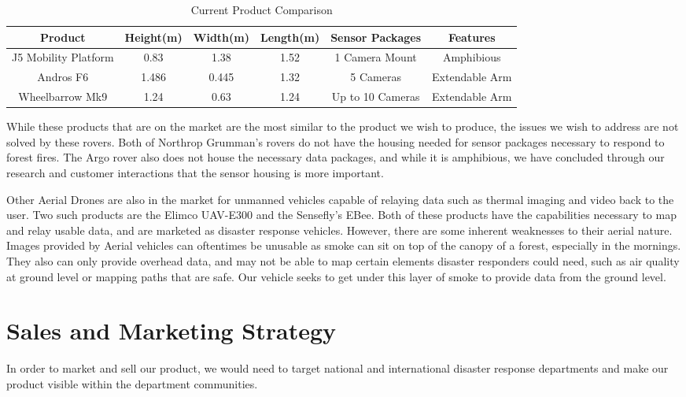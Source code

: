 \begin{table}[H]
	\begin{adjustwidth}{-.5in}{-.5in}
		\centering
		\begin{tabular}{c|c|c|c|c|c}
			Product & Height(m) & Width(m) & Length(m) & Sensor Packages & Features\\\hline
			J5 Mobility Platform & 0.83 & 1.38 & 1.52 & 1 Camera Mount & Amphibious\\
			Andros F6 & 1.486 & 0.445 & 1.32 & 5 Cameras & Extendable Arm \\
			Wheelbarrow Mk9 & 1.24 & 0.63 & 1.24 & Up to 10 Cameras & Extendable Arm\\
		\end{tabular}
		\caption{\label{tab:current} Current Product Comparison}
	\end{adjustwidth}
\end{table}

While these products that are on the market are the most similar to the product we wish to produce, the issues we wish to address are not solved by these rovers. Both of Northrop Grumman's rovers do not have the housing needed for sensor packages necessary to respond to forest fires. The Argo rover also does not house the necessary data packages, and while it is amphibious, we have concluded through our research and customer interactions that the sensor housing is more important.

Other Aerial Drones are also in the market for unmanned vehicles capable of relaying data such as thermal imaging and video back to the user. Two such products are the Elimco UAV-E300 and the Sensefly's EBee. Both of these products have the capabilities necessary to map and relay usable data, and are marketed as disaster response vehicles. However, there are some inherent weaknesses to their aerial nature. Images provided by Aerial vehicles can oftentimes be unusable as smoke can sit on top of the canopy of a forest, especially in the mornings. They also can only provide overhead data, and may not be able to map certain elements disaster responders could need, such as air quality at ground level or mapping paths that are safe. Our vehicle seeks to get under this layer of smoke to provide data from the ground level.


\section{Sales and Marketing Strategy}

In order to market and sell our product, we would need to target national and international disaster response departments and make our product visible within the department communities. 

